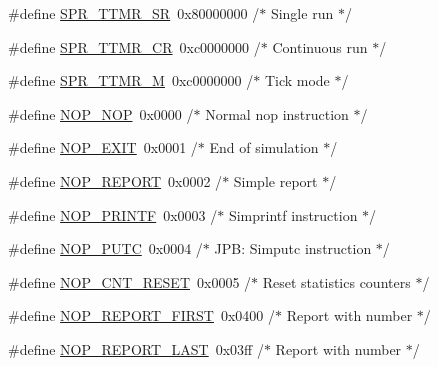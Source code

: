 \begin{DoxyCompactItemize}
\item 
\#define \hyperlink{spr-defs_8h_a8c6dad230640dae5b875c5a8a34a9731}{\-S\-P\-R\-\_\-\-T\-T\-M\-R\-\_\-\-S\-R}~0x80000000  /$\ast$ Single run $\ast$/
\item 
\#define \hyperlink{spr-defs_8h_a5883f49c845526bfaa672098a99e1bc2}{\-S\-P\-R\-\_\-\-T\-T\-M\-R\-\_\-\-C\-R}~0xc0000000  /$\ast$ Continuous run $\ast$/
\item 
\#define \hyperlink{spr-defs_8h_aca836ea9953b133ab12a61487fe0eebb}{\-S\-P\-R\-\_\-\-T\-T\-M\-R\-\_\-\-M}~0xc0000000  /$\ast$ Tick mode $\ast$/
\item 
\#define \hyperlink{spr-defs_8h_a47cf8c2c09f5c42e8ca6a7673f052b6c}{\-N\-O\-P\-\_\-\-N\-O\-P}~0x0000      /$\ast$ Normal nop instruction $\ast$/
\item 
\#define \hyperlink{spr-defs_8h_a687b241988bb87d7182975a0579f0937}{\-N\-O\-P\-\_\-\-E\-X\-I\-T}~0x0001      /$\ast$ End of simulation $\ast$/
\item 
\#define \hyperlink{spr-defs_8h_ac03e2b85051e7d7fb135eff9621593d3}{\-N\-O\-P\-\_\-\-R\-E\-P\-O\-R\-T}~0x0002      /$\ast$ Simple report $\ast$/
\item 
\#define \hyperlink{spr-defs_8h_a61a725892ee94ce621441efbe3a39bdf}{\-N\-O\-P\-\_\-\-P\-R\-I\-N\-T\-F}~0x0003      /$\ast$ Simprintf instruction $\ast$/
\item 
\#define \hyperlink{spr-defs_8h_a0a98ecdd01067bb7348e4bb3df389eaf}{\-N\-O\-P\-\_\-\-P\-U\-T\-C}~0x0004      /$\ast$ J\-P\-B\-: Simputc instruction $\ast$/
\item 
\#define \hyperlink{spr-defs_8h_adb30fdbe57996577b5bec561ebb75953}{\-N\-O\-P\-\_\-\-C\-N\-T\-\_\-\-R\-E\-S\-E\-T}~0x0005	    /$\ast$ Reset statistics counters $\ast$/
\item 
\#define \hyperlink{spr-defs_8h_aa3fc7d7ca0b51257700fc6b248d1f857}{\-N\-O\-P\-\_\-\-R\-E\-P\-O\-R\-T\-\_\-\-F\-I\-R\-S\-T}~0x0400     /$\ast$ Report with number $\ast$/
\item 
\#define \hyperlink{spr-defs_8h_ac1390be32f334a1c1d53d130205ed2ad}{\-N\-O\-P\-\_\-\-R\-E\-P\-O\-R\-T\-\_\-\-L\-A\-S\-T}~0x03ff      /$\ast$ Report with number $\ast$/
\end{DoxyCompactItemize}


